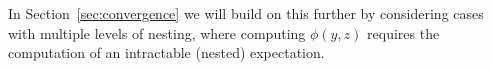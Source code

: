 In Section~\ref{sec:convergence} we will build on this further by considering cases with multiple
levels of nesting, where computing $\phi(y,z)$ requires the computation of an intractable (nested) expectation.
%
